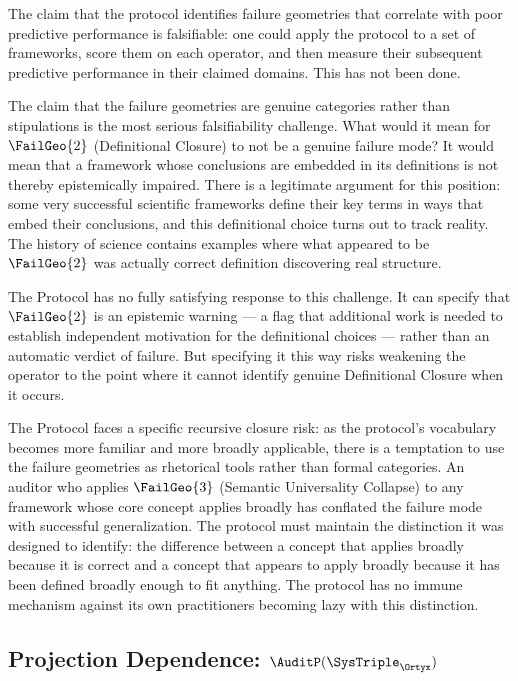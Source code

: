 The claim that the protocol identifies failure geometries
that correlate with poor predictive performance is
falsifiable: one could apply the protocol to a set
of frameworks, score them on each operator, and then
measure their subsequent predictive performance in
their claimed domains. This has not been done.

The claim that the failure geometries are genuine
categories rather than stipulations is the most serious
falsifiability challenge. What would it mean for
$\FailGeo{2}$ (Definitional Closure) to not be a
genuine failure mode? It would mean that a framework
whose conclusions are embedded in its definitions
is not thereby epistemically impaired. There is a
legitimate argument for this position: some very
successful scientific frameworks define their key
terms in ways that embed their conclusions, and this
definitional choice turns out to track reality. The
history of science contains examples where what appeared
to be $\FailGeo{2}$ was actually correct definition
discovering real structure.

The \Ortyx{} Protocol has no fully satisfying response
to this challenge. It can specify that $\FailGeo{2}$
is an epistemic warning --- a flag that additional
work is needed to establish independent motivation
for the definitional choices --- rather than an
automatic verdict of failure. But specifying it this
way risks weakening the operator to the point where
it cannot identify genuine Definitional Closure when
it occurs.

\begin{dangerzone}
The \Ortyx{} Protocol faces a specific recursive
closure risk: as the protocol's vocabulary becomes
more familiar and more broadly applicable, there is
a temptation to use the failure geometries as rhetorical
tools rather than formal categories. An auditor who
applies $\FailGeo{3}$ (Semantic Universality Collapse)
to any framework whose core concept applies broadly
has conflated the failure mode with successful
generalization. The protocol must maintain the
distinction it was designed to identify: the difference
between a concept that applies broadly because it is
correct and a concept that appears to apply broadly
because it has been defined broadly enough to fit
anything. The protocol has no immune mechanism against
its own practitioners becoming lazy with this distinction.
\end{dangerzone}

\subsection{Projection Dependence: \texorpdfstring{$\AuditP(\SysTriple_{\Ortyx})$}{P(Ortyx)}}

